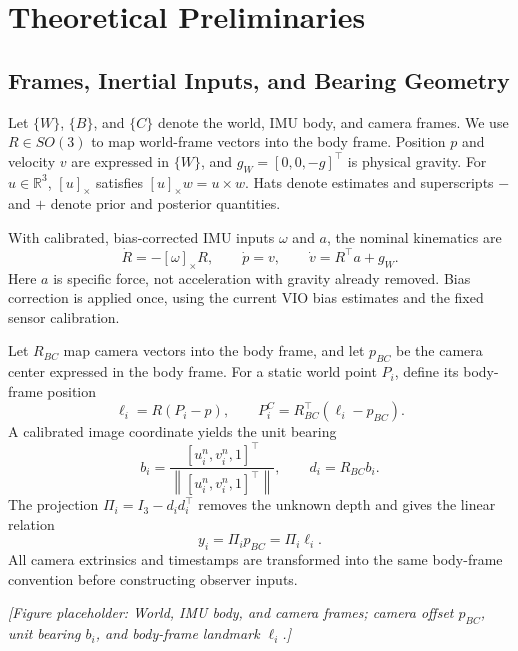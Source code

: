 \documentclass[a4paper,runningheads,twocolumn]{llncs}
\newcommand{\R}{\mathbb{R}}
\newcommand{\sk}[1]{[#1]_{\times}}
\newcommand{\norm}[1]{\left\lVert #1\right\rVert}
\newcommand{\placeholder}[1]{\par\smallskip\noindent\textit{[Figure placeholder: #1]}\par\smallskip}
\begin{document}
\section{Theoretical Preliminaries}
\subsection{Frames, Inertial Inputs, and Bearing Geometry}
Let $\{W\}$, $\{B\}$, and $\{C\}$ denote the world, IMU body, and camera frames. We use $R\in SO(3)$ to map world-frame vectors into the body frame. Position $p$ and velocity $v$ are expressed in $\{W\}$, and $g_W=[0,0,-g]^\top$ is physical gravity. For $u\in\R^3$, $\sk{u}$ satisfies $\sk{u}w=u\times w$. Hats denote estimates and superscripts $-$ and $+$ denote prior and posterior quantities.

With calibrated, bias-corrected IMU inputs $\omega$ and $a$, the nominal kinematics are
\begin{equation}
 \dot R=-\sk{\omega}R,\qquad
 \dot p=v,\qquad
 \dot v=R^\top a+g_W .
 \label{eq:kinematics}
\end{equation}
Here $a$ is specific force, not acceleration with gravity already removed. Bias correction is applied once, using the current VIO bias estimates and the fixed sensor calibration.

Let $R_{BC}$ map camera vectors into the body frame, and let $p_{BC}$ be the camera center expressed in the body frame. For a static world point $P_i$, define its body-frame position
\begin{equation}
 \ell_i=R(P_i-p),\qquad
 P_i^C=R_{BC}^{\top}(\ell_i-p_{BC}).
 \label{eq:pointframes}
\end{equation}
A calibrated image coordinate yields the unit bearing
\begin{equation}
 b_i=\frac{[u_i^{n},v_i^{n},1]^\top}
 {\norm{[u_i^{n},v_i^{n},1]^\top}},\qquad d_i=R_{BC}b_i .
\end{equation}
The projection $\Pi_i=I_3-d_id_i^\top$ removes the unknown depth and gives the linear relation
\begin{equation}
 y_i=\Pi_i p_{BC}=\Pi_i\ell_i .
 \label{eq:bearing}
\end{equation}
All camera extrinsics and timestamps are transformed into the same body-frame convention before constructing observer inputs.
\placeholder{World, IMU body, and camera frames; camera offset $p_{BC}$, unit bearing $b_i$, and body-frame landmark $\ell_i$.}
\end{document}
